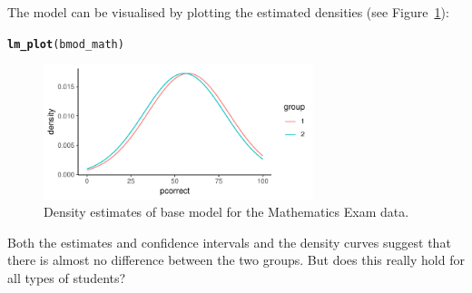 \documentclass{josr}\usepackage[]{graphicx}\usepackage[]{color}
\makeatletter
\newcommand{\hlstd}[1]{\textcolor[rgb]{0.345,0.345,0.345}{#1}}%
\newcommand{\hlkwd}[1]{\textcolor[rgb]{0.737,0.353,0.396}{\textbf{#1}}}%
\newenvironment{kframe}{%
 \def\at@end@of@kframe{}%
 \ifinner\ifhmode%
  \def\at@end@of@kframe{\end{minipage}}%
  \begin{minipage}{\columnwidth}%
 \fi\fi%
 \def\FrameCommand##1{\hskip\@totalleftmargin \hskip-\fboxsep
 \colorbox{shadecolor}{##1}\hskip-\fboxsep
     \hskip-\linewidth \hskip-\@totalleftmargin \hskip\columnwidth}%
 \MakeFramed {\advance\hsize-\width
   \@totalleftmargin\z@ \linewidth\hsize
   \@setminipage}}%
 {\par\unskip\endMakeFramed%
 \at@end@of@kframe}
\newenvironment{knitrout}{}{} %
\makeatother
\begin{document}
The model can be visualised by plotting the estimated densities
(see Figure~\ref{fig:math_bmod_vis}):
\begin{knitrout}
\color{fgcolor}\begin{kframe}
\begin{alltt}
\hlkwd{lm_plot}\hlstd{(bmod_math)}
\end{alltt}
\end{kframe}\begin{figure}

{\centering \includegraphics[width=0.7\textwidth]{figure/math_bmod_vis-1} 

}

\caption[Density estimates of base model for the Mathematics Exam data]{Density estimates of base model for the Mathematics Exam data.}\label{fig:math_bmod_vis}
\end{figure}


\end{knitrout}
Both the estimates and confidence intervals and the density curves suggest that
there is almost no difference between the two groups. But does this really hold
for all types of students?
\end{document}
